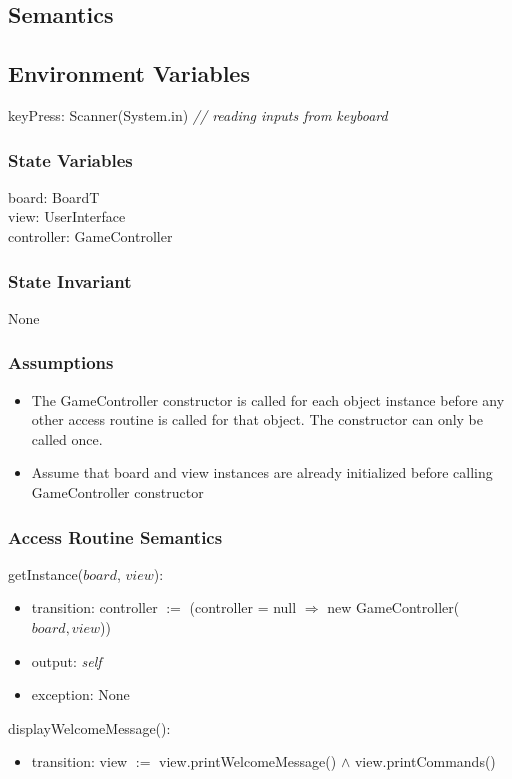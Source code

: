 \documentclass[12pt]{article}
\begin{document}
\subsection* {Semantics}

\subsection*{Environment Variables}
keyPress: Scanner(System.in) \qquad \textit{// reading inputs from keyboard}

\subsubsection* {State Variables}
board: BoardT \\
view: UserInterface \\
controller: GameController

\subsubsection* {State Invariant}
None

\subsubsection* {Assumptions}
\begin{itemize}
  \item The GameController constructor is called for each object instance before any
  other access routine is called for that object.  The constructor can only be
  called once.
  \item Assume that board and view instances are already initialized before calling GameController
        constructor
\end{itemize}

\subsubsection* {Access Routine Semantics}
getInstance($board$, $view$):
\begin{itemize}
  \item transition: controller $:=$ (controller = null $\Rightarrow$ new GameController($board, view$))
  \item output: \textit{self}
  \item exception: None
\end{itemize}

\noindent displayWelcomeMessage():
\begin{itemize}
  \item transition: view $:=$ view.printWelcomeMessage() $\wedge$ view.printCommands()
\end{itemize}
\end{document}
